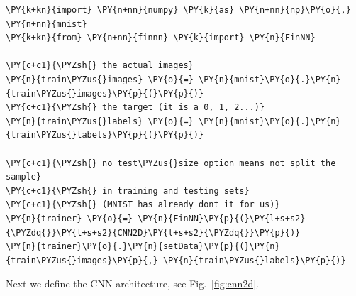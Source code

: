 \begin{tcolorbox}[breakable, size=fbox, boxrule=1pt, pad at break*=1mm,colback=cellbackground, colframe=cellborder]
\begin{Verbatim}[commandchars=\\\{\}]
\PY{k+kn}{import} \PY{n+nn}{numpy} \PY{k}{as} \PY{n+nn}{np}\PY{o}{,} \PY{n+nn}{mnist}
\PY{k+kn}{from} \PY{n+nn}{finnn} \PY{k}{import} \PY{n}{FinNN}
	
\PY{c+c1}{\PYZsh{} the actual images}
\PY{n}{train\PYZus{}images} \PY{o}{=} \PY{n}{mnist}\PY{o}{.}\PY{n}{train\PYZus{}images}\PY{p}{(}\PY{p}{)} 
\PY{c+c1}{\PYZsh{} the target (it is a 0, 1, 2...)}
\PY{n}{train\PYZus{}labels} \PY{o}{=} \PY{n}{mnist}\PY{o}{.}\PY{n}{train\PYZus{}labels}\PY{p}{(}\PY{p}{)} 
	
\PY{c+c1}{\PYZsh{} no test\PYZus{}size option means not split the sample}
\PY{c+c1}{\PYZsh{} in training and testing sets}
\PY{c+c1}{\PYZsh{} (MNIST has already dont it for us)}
\PY{n}{trainer} \PY{o}{=} \PY{n}{FinNN}\PY{p}{(}\PY{l+s+s2}{\PYZdq{}}\PY{l+s+s2}{CNN2D}\PY{l+s+s2}{\PYZdq{}}\PY{p}{)}
\PY{n}{trainer}\PY{o}{.}\PY{n}{setData}\PY{p}{(}\PY{n}{train\PYZus{}images}\PY{p}{,} \PY{n}{train\PYZus{}labels}\PY{p}{)}
\end{Verbatim}
\end{tcolorbox}

Next we define the CNN architecture, see Fig.~\ref{fig:cnn2d}.

